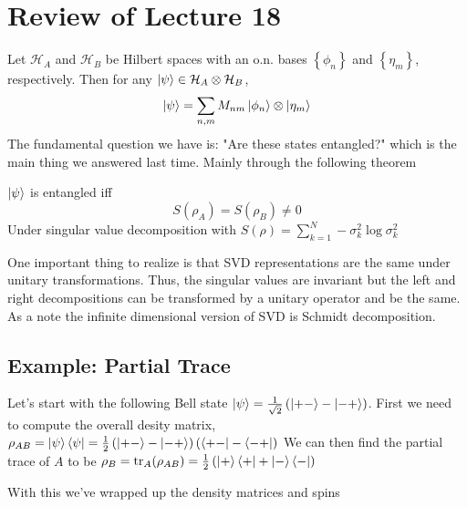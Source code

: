 \section{Review of Lecture 18}
Let $\mathcal{H}_A$ and $\mathcal{H}_B$ be Hilbert spaces with 
an o.n. bases $\left\{\phi_n\right\}$ and $\left\{\eta_m\right\}$, respectively.
Then for any $\Ket{\psi} \in \mathcal{H}_A \otimes \mathcal{H}_B$,
$$
    \Ket{\psi} =
    \sum_{n,m} M_{nm} \Ket{\phi_n} \otimes \Ket{\eta_m}
$$
The fundamental question we have is: "Are these states entangled?"
which is the main thing we answered last time. Mainly through the following
theorem
\begin{theorem}
\label{entanglesStates}
$\Ket{\psi}$ is entangled iff
$$
    S (\rho_A) = S(\rho_B) \ne 0
$$
Under singular value decomposition with
$S(\rho) = \sum_{k=1}^{N} - \sigma_k^2 \log \sigma_k^2$
\end{theorem}
One important thing to realize is that SVD representations are the same
under unitary transformations. Thus, the singular values are invariant
but the left and right decompositions can be transformed by a unitary operator
and be the same. As a note the infinite dimensional version of SVD
is {\color{red} Schmidt decomposition}. 

\subsection{Example: Partial Trace}
Let's start with the following Bell state
$\Ket{\psi} = \frac{1}{\sqrt{2}} \left(\Ket{+-} - \Ket{-+}\right)$.
First we need to compute the overall desity matrix,
$\rho_{AB} = \Ket{\psi}\Bra{\psi} = \frac{1}{2} 
\left(\Ket{+-} - \Ket{-+}\right)\left(\Bra{+-} - \Bra{-+}\right)$
We can then find the partial trace of $A$ to be
$\rho_B = \operatorname{tr}_A (\rho_{AB}) = \frac{1}{2} \left(\Ket{+}\Bra{+} + \Ket{-}\Bra{-}\right)$

With this we've wrapped up the density matrices and spins

